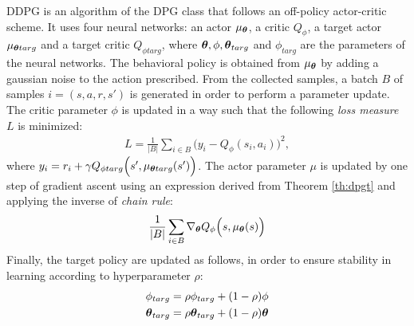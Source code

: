 \newline
\acf{DDPG} is an algorithm of the \ac{DPG} class that follows an off-policy actor-critic scheme. It uses four neural networks: an actor $\mu_{\boldsymbol{\theta}}$, a critic $Q_{\phi}$, a target actor $\mu_{\boldsymbol{\theta} targ}$ and a target critic $Q_{\phi targ}$, where $\boldsymbol{\theta}, \phi, \boldsymbol{\theta}_{targ}$ and $\phi_{targ}$ are the parameters of the neural networks. The behavioral policy is obtained from $\mu_{\boldsymbol{\theta}}$ by adding a gaussian noise to the action prescribed. From the collected samples, a batch $B$ of samples $i = (s,a,r,s')$ is generated in order to perform a parameter update.\\
\newline
The critic parameter $\phi$ is updated in a way such that the following \emph{loss measure} $L$ is minimized:
\begin{align}
	L = \frac{1}{|B|} \sum_{i \in B}\Big(y_i - Q_{\phi}(s_i, a_i) \Big)^2,
\end{align}
where $y_i = r_i + \gamma Q_{\phi targ}\Big(s', \mu_{\boldsymbol{\theta} targ}(s')\Big)$. The actor parameter $\mu$ is updated by one step of gradient ascent using an expression derived from Theorem \ref{th:dpgt} and applying the inverse of \emph{chain rule}:
\begin{align}
	\frac{1}{|B|}\sum_{i \in B}\nabla_{\boldsymbol{\theta}}Q_{\phi}\Big(s, \mu_{\boldsymbol{\theta}}(s)\Big)
\end{align}
Finally, the target policy are updated as follows, in order to ensure stability in learning according to hyperparameter $\rho$:
\begin{align}
	\phi_{targ} &= \rho \phi_{targ} + (1 - \rho) \phi\\
	\boldsymbol{\theta}_{targ} &= \rho \boldsymbol{\theta}_{targ} + (1 - \rho) \boldsymbol{\theta}
\end{align}

